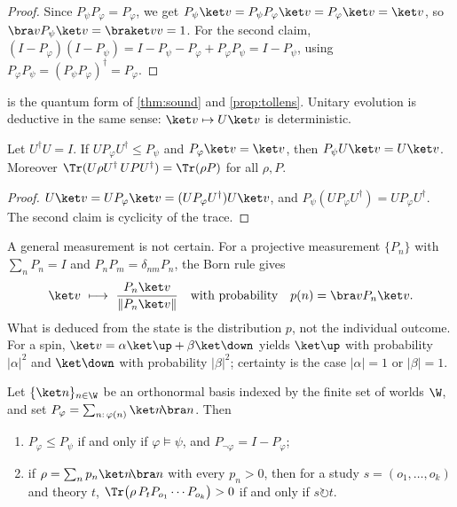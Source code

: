\begin{proof}
Since $P_\psi P_\varphi=P_\varphi$, we get $P_\psi\ket v=P_\psi P_\varphi\ket v=P_\varphi\ket v=\ket v$,
so $\bra v P_\psi\ket v=\braket vv=1$. For the second claim,
$(I-P_\varphi)(I-P_\psi)=I-P_\psi-P_\varphi+P_\varphi P_\psi=I-P_\psi$, using
$P_\varphi P_\psi=(P_\psi P_\varphi)^\dagger=P_\varphi$.
\end{proof}

 is the quantum form of \cref{thm:sound} and \cref{prop:tollens}. Unitary
evolution is deductive in the same sense: $\ket v\mapsto U\ket v$ is deterministic.

\begin{proposition}\label{prop:unitary}
Let $U^\dagger U=I$. If $UP_\varphi U^\dagger\le P_\psi$ and $P_\varphi\ket v=\ket v$, then
$P_\psi U\ket v=U\ket v$. Moreover $\Tr(U\rho U^\dagger\,UPU^\dagger)=\Tr(\rho P)$ for all $\rho,P$.
\end{proposition}

\begin{proof}
$U\ket v=UP_\varphi\ket v=(UP_\varphi U^\dagger)U\ket v$, and $P_\psi(UP_\varphi U^\dagger)=UP_\varphi U^\dagger$.
The second claim is cyclicity of the trace.
\end{proof}

A general measurement is not certain. For a projective measurement $\{P_n\}$ with
$\sum_n P_n=I$ and $P_nP_m=\delta_{nm}P_n$, the Born rule gives
\[
  \ket v\ \longmapsto\ \frac{P_n\ket v}{\lVert P_n\ket v\rVert}
  \quad\text{with probability}\quad p(n)=\bra vP_n\ket v .
\]
What is deduced from the state is the distribution $p$, not the individual outcome. For a spin,
$\ket v=\alpha\ket\up+\beta\ket\down$ yields $\ket\up$ with probability $|\alpha|^2$ and
$\ket\down$ with probability $|\beta|^2$; certainty is the case $|\alpha|=1$ or $|\beta|=1$.

\begin{proposition}\label{prop:classical}
Let $\{\ket n\}_{n\in\W}$ be an orthonormal basis indexed by the finite set of worlds $\W$, and set
$P_\varphi=\sum_{n:\,\varphi(n)}\ket n\!\bra n$. Then
\begin{enumerate}
  \item $P_\varphi\le P_\psi$ if and only if $\varphi\models\psi$, and $P_{\neg\varphi}=I-P_\varphi$;
  \item if $\rho=\sum_n p_n\ket n\!\bra n$ with every $p_n>0$, then for a study
        $s=(o_1,\dots,o_k)$ and theory $t$,
        $\Tr\bigl(\rho\,P_t P_{o_1}\cdots P_{o_k}\bigr)>0$ if and only if $s\circlearrowright t$.
\end{enumerate}
\end{proposition}

